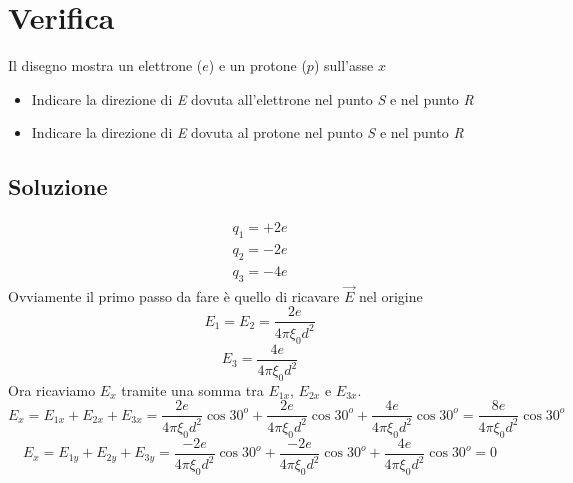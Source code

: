 \section{Verifica}
\begin{center}
\end{center}
Il disegno mostra un elettrone ($e$) e un protone ($p$) sull'asse $x$
\begin{itemize}
	\item Indicare la direzione di \textit{E} dovuta all’elettrone nel
           punto \textit{S} e nel punto \textit{R}
        \item Indicare la direzione di \textit{E} dovuta al protone nel
punto \textit{S} e nel punto \textit{R}
\end{itemize}
\subsection {Soluzione}
\begin{equation}
  \begin{matrix}
    q_1=+2e\\
    q_2=-2e\\
    q_3=-4e
  \end{matrix}
\end{equation}
Ovviamente il primo passo da fare è quello di ricavare $\vec{E}$ nel origine
\begin{equation}
  E_1=E_2=\frac{2e}{4\pi\xi_0d^2}
\end{equation}
\begin{equation}
	E_3=\frac{4e}{4\pi\xi_0d^2}
\end{equation}
Ora ricaviamo $E_x$ tramite una somma tra $E_{1x}$, $E_{2x}$ e $E_{3x}$.
\begin{equation}
	E_x=E_{1x}+E_{2x}+E_{3x}=\frac{2e}{4\pi\xi_0d^2}\cos{30^o}+\frac{2e}{4\pi\xi_0d^2}\cos{30^o}+\frac{4e}{4\pi\xi_0d^2}\cos{30^o}=\frac{8e}{4\pi\xi_0d^2}\cos{30^o}
\end{equation}
\begin{equation}
	E_x=E_{1y}+E_{2y}+E_{3y}=\frac{-2e}{4\pi\xi_0d^2}\cos{30^o}+\frac{-2e}{4\pi\xi_0d^2}\cos{30^o}+\frac{4e}{4\pi\xi_0d^2}\cos{30^o}=0
\end{equation}
